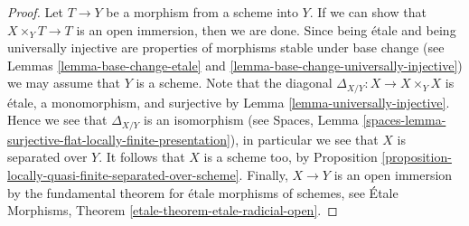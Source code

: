 \documentclass[10pt,a4paper]{amsart}
\theoremstyle{plain}
\theoremstyle{definition}
\theoremstyle{remark}
\numberwithin{equation}{subsection}
\begin{document}
\begin{proof}
Let $T \to Y$ be a morphism from a scheme into $Y$.
If we can show that $X \times_Y T \to T$ is an open immersion, then we
are done. Since being \'etale and being universally injective are
properties of morphisms stable under base change (see
Lemmas \ref{lemma-base-change-etale} and
\ref{lemma-base-change-universally-injective})
we may assume that $Y$ is a scheme. Note that the
diagonal $\Delta_{X/Y} : X \to X \times_Y X$ is \'etale, a monomorphism, and
surjective by
Lemma \ref{lemma-universally-injective}.
Hence we see that $\Delta_{X/Y}$ is an isomorphism (see
Spaces, Lemma
\ref{spaces-lemma-surjective-flat-locally-finite-presentation}),
in particular we see that $X$ is separated over $Y$.
It follows that $X$ is a scheme too, by
Proposition \ref{proposition-locally-quasi-finite-separated-over-scheme}.
Finally, $X \to Y$ is an open immersion by the fundamental theorem
for \'etale morphisms of schemes, see
\'Etale Morphisms, Theorem \ref{etale-theorem-etale-radicial-open}.
\end{proof}
\end{document}
